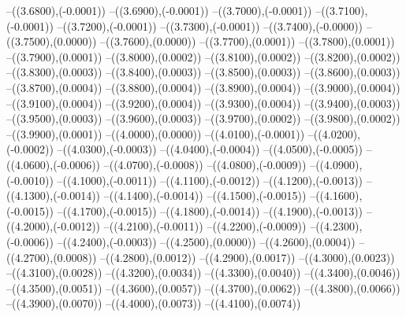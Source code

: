 {	--({\sx*(3.6800)},{\sy*(-0.0001)})
	--({\sx*(3.6900)},{\sy*(-0.0001)})
	--({\sx*(3.7000)},{\sy*(-0.0001)})
	--({\sx*(3.7100)},{\sy*(-0.0001)})
	--({\sx*(3.7200)},{\sy*(-0.0001)})
	--({\sx*(3.7300)},{\sy*(-0.0001)})
	--({\sx*(3.7400)},{\sy*(-0.0000)})
	--({\sx*(3.7500)},{\sy*(0.0000)})
	--({\sx*(3.7600)},{\sy*(0.0000)})
	--({\sx*(3.7700)},{\sy*(0.0001)})
	--({\sx*(3.7800)},{\sy*(0.0001)})
	--({\sx*(3.7900)},{\sy*(0.0001)})
	--({\sx*(3.8000)},{\sy*(0.0002)})
	--({\sx*(3.8100)},{\sy*(0.0002)})
	--({\sx*(3.8200)},{\sy*(0.0002)})
	--({\sx*(3.8300)},{\sy*(0.0003)})
	--({\sx*(3.8400)},{\sy*(0.0003)})
	--({\sx*(3.8500)},{\sy*(0.0003)})
	--({\sx*(3.8600)},{\sy*(0.0003)})
	--({\sx*(3.8700)},{\sy*(0.0004)})
	--({\sx*(3.8800)},{\sy*(0.0004)})
	--({\sx*(3.8900)},{\sy*(0.0004)})
	--({\sx*(3.9000)},{\sy*(0.0004)})
	--({\sx*(3.9100)},{\sy*(0.0004)})
	--({\sx*(3.9200)},{\sy*(0.0004)})
	--({\sx*(3.9300)},{\sy*(0.0004)})
	--({\sx*(3.9400)},{\sy*(0.0003)})
	--({\sx*(3.9500)},{\sy*(0.0003)})
	--({\sx*(3.9600)},{\sy*(0.0003)})
	--({\sx*(3.9700)},{\sy*(0.0002)})
	--({\sx*(3.9800)},{\sy*(0.0002)})
	--({\sx*(3.9900)},{\sy*(0.0001)})
	--({\sx*(4.0000)},{\sy*(0.0000)})
	--({\sx*(4.0100)},{\sy*(-0.0001)})
	--({\sx*(4.0200)},{\sy*(-0.0002)})
	--({\sx*(4.0300)},{\sy*(-0.0003)})
	--({\sx*(4.0400)},{\sy*(-0.0004)})
	--({\sx*(4.0500)},{\sy*(-0.0005)})
	--({\sx*(4.0600)},{\sy*(-0.0006)})
	--({\sx*(4.0700)},{\sy*(-0.0008)})
	--({\sx*(4.0800)},{\sy*(-0.0009)})
	--({\sx*(4.0900)},{\sy*(-0.0010)})
	--({\sx*(4.1000)},{\sy*(-0.0011)})
	--({\sx*(4.1100)},{\sy*(-0.0012)})
	--({\sx*(4.1200)},{\sy*(-0.0013)})
	--({\sx*(4.1300)},{\sy*(-0.0014)})
	--({\sx*(4.1400)},{\sy*(-0.0014)})
	--({\sx*(4.1500)},{\sy*(-0.0015)})
	--({\sx*(4.1600)},{\sy*(-0.0015)})
	--({\sx*(4.1700)},{\sy*(-0.0015)})
	--({\sx*(4.1800)},{\sy*(-0.0014)})
	--({\sx*(4.1900)},{\sy*(-0.0013)})
	--({\sx*(4.2000)},{\sy*(-0.0012)})
	--({\sx*(4.2100)},{\sy*(-0.0011)})
	--({\sx*(4.2200)},{\sy*(-0.0009)})
	--({\sx*(4.2300)},{\sy*(-0.0006)})
	--({\sx*(4.2400)},{\sy*(-0.0003)})
	--({\sx*(4.2500)},{\sy*(0.0000)})
	--({\sx*(4.2600)},{\sy*(0.0004)})
	--({\sx*(4.2700)},{\sy*(0.0008)})
	--({\sx*(4.2800)},{\sy*(0.0012)})
	--({\sx*(4.2900)},{\sy*(0.0017)})
	--({\sx*(4.3000)},{\sy*(0.0023)})
	--({\sx*(4.3100)},{\sy*(0.0028)})
	--({\sx*(4.3200)},{\sy*(0.0034)})
	--({\sx*(4.3300)},{\sy*(0.0040)})
	--({\sx*(4.3400)},{\sy*(0.0046)})
	--({\sx*(4.3500)},{\sy*(0.0051)})
	--({\sx*(4.3600)},{\sy*(0.0057)})
	--({\sx*(4.3700)},{\sy*(0.0062)})
	--({\sx*(4.3800)},{\sy*(0.0066)})
	--({\sx*(4.3900)},{\sy*(0.0070)})
	--({\sx*(4.4000)},{\sy*(0.0073)})
	--({\sx*(4.4100)},{\sy*(0.0074)})
}
